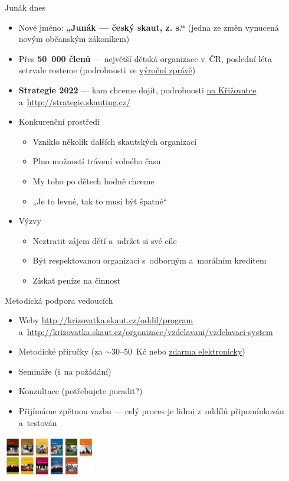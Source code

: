 \documentclass[hyperref={bookmarks=true, unicode=true, colorlinks=true, plainpages=false, pdfkeywords={Skaut, Junak, Skauting, Vychovna metoda}, linkcolor=OrangeRed, anchorcolor=OrangeRed, citecolor=RawSienna, filecolor=RawSienna, menucolor=OrangeRed, urlcolor=RawSienna, pdftex}, compress, xelatex, xcolor=dvipsnames, print]{beamer}
\begin{document}
\begin{frame}{Junák dnes}
\begin{itemize}
 \item Nové jméno: \textbf{„Junák --- český skaut, z. s.“} (jedna ze změn vynucená novým občanským zákoníkem)
 \item Přes \textbf{50~000 členů} --- největší dětská organizace v~ČR, poslední léta setrvale rosteme (podrobnosti ve \href{http://www.skaut.cz/skauting/o-skautingu}{výroční zprávě})
 \item \textbf{Strategie 2022} --- kam chceme dojít, podrobnosti \href{http://krizovatka.skaut.cz/organizace/strategie}{na Křižovatce} a~\href{http://strategie.skauting.cz/}{http://strategie.skauting.cz/}
 \item Konkurenční prostředí
 \begin{itemize}
  \item Vzniklo několik dalších skautských organizací
  \item Plno možností trávení volného času
  \item My toho po dětech hodně chceme
  \item „Je to levné, tak to musí být špatné“
 \end{itemize}
 \item Výzvy
 \begin{itemize}
  \item Neztratit zájem dětí a~udržet si své cíle
  \item Být respektovanou organizací s~odborným a~morálním kreditem
  \item Získat peníze na činnost
 \end{itemize}
\end{itemize}
\end{frame}

\begin{frame}{Metodická podpora vedoucích}
\begin{itemize}
\item Weby \href{http://krizovatka.skaut.cz/oddil/program}{http://krizovatka.skaut.cz/oddil/program} a~\href{http://krizovatka.skaut.cz/organizace/vzdelavani/vzdelavaci-system}{http://krizovatka.skaut.cz/organizace/vzdelavani/vzdelavaci-system}
\item Metodické příručky (za $\sim$30--50~Kč nebo \href{http://www.obchod.skaut.cz/index.php?tpl=&_artperpage=99&cl=alist&searchparam=&cnid=701}{zdarma elektronicky})
\item Semináře (i~na  požádání)
\item Konzultace (potřebujete poradit?)
\item Přijímáme zpětnou vazbu --- celý proces je lidmi z~oddílů připomínkován a~testován
\end{itemize}
\begin{center}
\includegraphics[width=4cm]{prirucky.png}
\end{center}
\end{frame}
\end{document}
